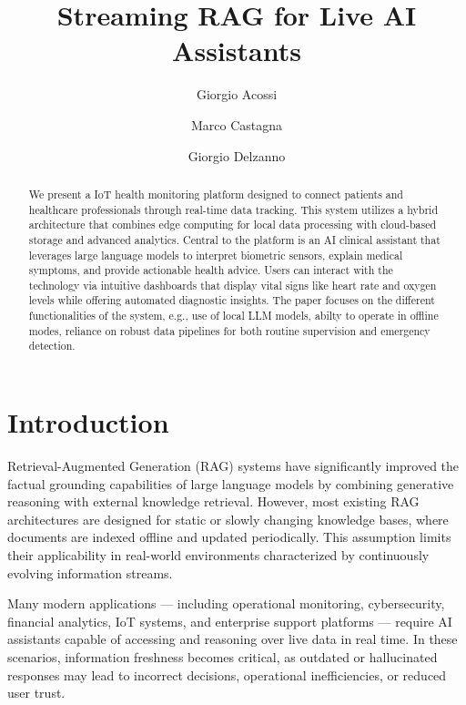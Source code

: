 \documentclass[runningheads]{llncs}
\begin{document}
%
\title{Streaming RAG for Live AI Assistants}
%
%
\author{
Giorgio Acossi
\and
Marco Castagna
\and 
Giorgio Delzanno
}
%
%
%
\maketitle              %
%
\begin{abstract}
We present a  IoT health monitoring platform designed to connect patients and healthcare professionals through real-time data tracking. This system utilizes a hybrid architecture that combines edge computing for local data processing with cloud-based storage and advanced analytics. Central to the platform is an AI clinical assistant that leverages large language models to interpret biometric sensors, explain medical symptoms, and provide actionable health advice. Users can interact with the technology via intuitive dashboards that display vital signs like heart rate and oxygen levels while offering automated diagnostic insights. The paper focuses on the different functionalities of the system, e.g., use of local LLM models, abilty to operate in offline modes, reliance on robust data pipelines for both routine supervision and emergency detection.
\end{abstract}
%
%
%
\section{Introduction}

Retrieval-Augmented Generation (RAG) systems have significantly improved the factual grounding capabilities of large language models by combining generative reasoning with external knowledge retrieval. However, most existing RAG architectures are designed for static or slowly changing knowledge bases, where documents are indexed offline and updated periodically. This assumption limits their applicability in real-world environments characterized by continuously evolving information streams.

Many modern applications — including operational monitoring, cybersecurity, financial analytics, IoT systems, and enterprise support platforms — require AI assistants capable of accessing and reasoning over live data in real time. In these scenarios, information freshness becomes critical, as outdated or hallucinated responses may lead to incorrect decisions, operational inefficiencies, or reduced user trust.
\end{document}
